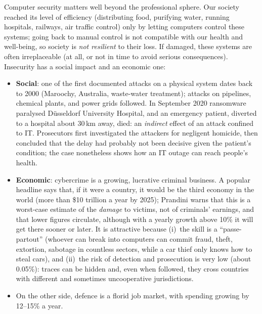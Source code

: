 Computer security matters well beyond the professional sphere. Our society reached its level of efficiency (distributing food, purifying water, running hospitals, railways, air traffic control) only by letting computers control these systems; going back to manual control is not compatible with our health and well-being, so society is \emph{not resilient} to their loss. If damaged, these systems are often irreplaceable (at all, or not in time to avoid serious consequences). Insecurity has a social impact and an economic one:
\begin{itemize}
    \item \textbf{Social}: one of the first documented attacks on a physical system dates back to 2000 (Maroochy, Australia, waste-water treatment); attacks on pipelines, chemical plants, and power grids followed. In September 2020 ransomware paralysed Düsseldorf University Hospital, and an emergency patient, diverted to a hospital about 30\,km away, died: an \emph{indirect} effect of an attack confined to IT. Prosecutors first investigated the attackers for negligent homicide, then concluded that the delay had probably not been decisive given the patient's condition; the case nonetheless shows how an IT outage can reach people's health.
    \item \textbf{Economic}: cybercrime is a growing, lucrative criminal business. A popular headline says that, if it were a country, it would be the third economy in the world (more than \$10 trillion a year by 2025); Prandini warns that this is a worst-case estimate of the \emph{damage} to victims, not of criminals' earnings, and that lower figures circulate, although with a yearly growth above 10\% it will get there sooner or later. It is attractive because (i)~the skill is a \enquote{passe-partout} (whoever can break into computers can commit fraud, theft, extortion, sabotage in countless sectors, while a car thief only knows how to steal cars), and (ii)~the risk of detection and prosecution is very low (about 0.05\%): traces can be hidden and, even when followed, they cross countries with different and sometimes uncooperative jurisdictions.
    \item On the other side, defence is a florid job market, with spending growing by 12--15\% a year.
\end{itemize}

